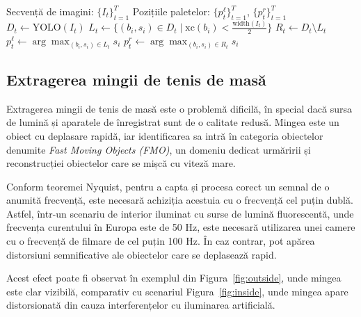 \begin{algorithm}[H]
\caption{Detecția paletelor de tenis de masă.}
\label{alg:paddle-detection}
\begin{algorithmic}[1]
\Require Secvență de imagini: $\{I_t\}_{t=1}^{T}$
\Ensure Pozițiile paletelor: $\{p^{\ell}_t\}_{t=1}^T$, $\{p^{r}_t\}_{t=1}^T$
    \State $D_t \gets \mathrm{YOLO}(I_t)$         
    \vspace{0.5em}
    \State $L_t \gets \{(b_i,s_i)\in D_t \mid \mathrm{xc}(b_i) < \tfrac{\mathrm{width}(I_t)}{2}\}$
    \vspace{0.5em}
    \State $R_t \gets D_t \setminus L_t$
    \vspace{0.5em}
    \State $p^{\ell}_t \gets \displaystyle\arg\max_{(b_i,s_i)\in L_t} s_i$
    \vspace{0.5em}
    \State $p^{r}_t \gets \displaystyle\arg\max_{(b_i,s_i)\in R_t} s_i$
\EndFor
\end{algorithmic}
\end{algorithm}



\subsection{Extragerea mingii de tenis de masă}
\label{subsec:ball-detect}
Extragerea mingii de tenis de masă este o problemă dificilă, în special dacă sursa de lumină și aparatele de înregistrat sunt de o calitate redusă. Mingea este un obiect cu deplasare rapidă, iar identificarea sa intră în categoria obiectelor denumite \textit{Fast Moving Objects (FMO\cite{Rozumnyi_2017})}, un domeniu dedicat urmăririi și reconstrucției obiectelor care se mișcă cu viteză mare.

Conform teoremei Nyquist\cite{Shannon1949}, pentru a capta și procesa corect un semnal de o anumită frecvență, este necesară achiziția acestuia cu o frecvență cel puțin dublă. Astfel, într-un scenariu de interior iluminat cu surse de lumină fluorescentă, unde frecvența curentului în Europa este de 50 Hz, este necesară utilizarea unei camere cu o frecvență de filmare de cel puțin 100 Hz. În caz contrar, pot apărea distorsiuni semnificative ale obiectelor care se deplasează rapid.

Acest efect poate fi observat în exemplul din Figura~\ref{fig:outside}, unde mingea este clar vizibilă, comparativ cu scenariul Figura~\ref{fig:inside}, unde mingea apare distorsionată din cauza interferențelor cu iluminarea artificială.

